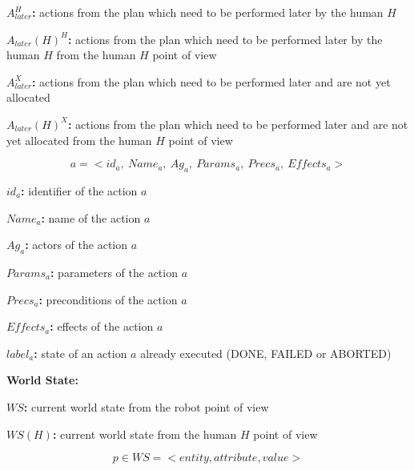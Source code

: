 \textbf{$A_{later}^H$:} actions from the plan which need to be performed later by the human $H$

\textbf{$A_{later}(H)^H$:} actions from the plan which need to be performed later by the human $H$ from the human $H$ point of view

\textbf{$A_{later}^X$:} actions from the plan which need to be performed later and are not yet allocated

\textbf{$A_{later}(H)^X$:} actions from the plan which need to be performed later and are not yet allocated from the human $H$ point of view

$$a = < id_{a}, \ Name_{a}, \ Ag_{a}, \ Params_{a}, \ Precs_{a}, \ Effects_{a} >$$

\textbf{$id_{a}$:} identifier of the action $a$

\textbf{$Name_{a}$:} name of the action $a$

\textbf{$Ag_{a}$:} actors of the action $a$

\textbf{$Params_{a}$:} parameters of the action $a$

\textbf{$Precs_{a}$:} preconditions of the action $a$

\textbf{$Effects_{a}$:} effects of the action $a$

\textbf{$label_{a}$:} state of an action $a$ already executed (DONE, FAILED or ABORTED)

\textbf{World State:}

\textbf{$WS$:} current world state from the robot point of view

\textbf{$WS(H)$:} current world state from the human $H$ point of view

$$p \in WS = <entity, attribute, value>$$

